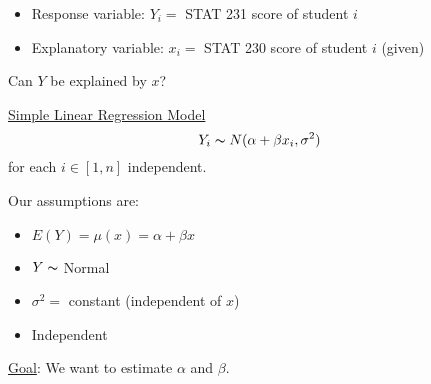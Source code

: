 \begin{exbox}
    \begin{example} $ \; $
        \begin{itemize}
            \item Response variable: $ Y_i= $ STAT 231 score of student $ i $
            \item Explanatory variable: $ x_i= $ STAT 230 score of student $ i $
                  (given)
        \end{itemize}
        Can $ Y $ be explained by $ x $?

        \underline{Simple Linear Regression Model}
        \[ Y_i \thicksim N(\alpha+\beta x_i,\sigma^2) \]
        for each $ i\in[1,n] $ independent.

        Our assumptions are:
        \begin{itemize}
            \item $ E(Y)=\mu(x)=\alpha+\beta x $
            \item $ Y \thicksim $ Normal
            \item $ \sigma^2= $ constant (independent of $ x $)
            \item Independent
        \end{itemize}
        \underline{Goal}: We want to estimate $ \alpha $ and $ \beta $.
    \end{example}
\end{exbox}
